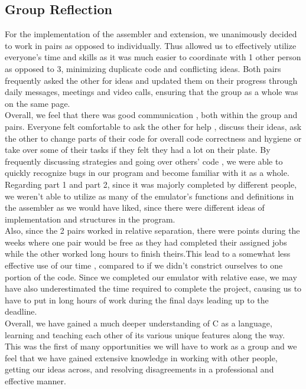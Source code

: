 \documentclass[11pt, letterpaper]{article}
\begin{document}
\subsection{Group Reflection}
For the implementation of the assembler and extension, we unanimously decided to work in pairs as opposed to individually. Thus allowed us to effectively utilize everyone's time and skills as it was much easier to coordinate with 1 other person as opposed to 3, minimizing duplicate code and conflicting ideas. Both pairs frequently asked the other for ideas and updated them on their progress through daily messages, meetings and video calls, ensuring that the group as a whole was on the same page.
\\ \newline
Overall, we feel that there was good communication , both within the group and pairs. Everyone felt comfortable to ask the other for help , discuss their ideas, ask the other to change parts of their code for overall code correctness and hygiene or take over some of their tasks if they felt they had a lot on their plate. By frequently discussing strategies and going over others' code , we were able to quickly recognize bugs in our program and become familiar with it as a whole.
\\ \newline
Regarding part 1 and part 2, since it was majorly completed by different people, we weren't able to utilize as many of the emulator's functions and definitions in the assembler as we would have liked, since there were different ideas of implementation and structures in the program.
\\ \newline
Also, since the 2 pairs worked in relative separation, there were points during the weeks where one pair would be free as they had completed their assigned jobs while the other worked long hours to finish theirs.This lead to a somewhat less effective use of our time , compared to if we didn't constrict ourselves to one portion of the code.
Since we completed our emulator with relative ease, we may have also underestimated the time required to complete the project, causing us to have to put in long hours of work during the final days leading up to the deadline.
\\ \newline
Overall, we have gained a much deeper understanding of C as a language, learning and teaching each other of its various unique features along the way. This was the first of many opportunities we will have to work as a group and we feel that we have gained extensive knowledge in working with other people, getting our ideas across, and resolving disagreements in a professional and effective manner.
\end{document}

